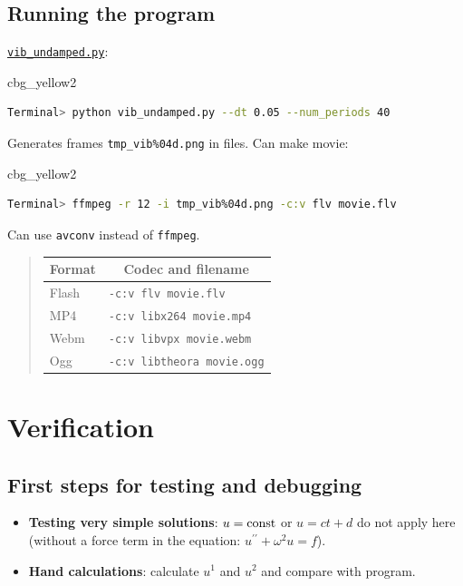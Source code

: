 \documentclass[%
oneside,                 %
final,                   %
10pt]{article}
\newenvironment{_cod_tight}[1]{
   \def\FrameCommand{\colorbox{#1}}
   \FrameRule0.6pt\MakeFramed {\FrameRestore}\vskip3mm}
   {\vskip0mm\endMakeFramed}
\newenvironment{cod}[1]{
\bgroup\rmfamily
\fboxsep=0mm\relax
\begin{_cod_tight}{#1}
\list{}{\parsep=-2mm\parskip=0mm\topsep=0pt\leftmargin=2mm
\rightmargin=2\leftmargin\leftmargin=4pt\relax}
\item\relax}
{\endlist\end{_cod_tight}\egroup}
\begin{document}
\subsection*{Running the program}

\href{{http://tinyurl.com/nm5587k/vib/vib_undamped.py}}{\nolinkurl{vib_undamped.py}}:

\begin{cod}{cbg_yellow2}\begin{lstlisting}[language=bash,style=simple,xleftmargin=2mm]
Terminal> python vib_undamped.py --dt 0.05 --num_periods 40
\end{lstlisting}\end{cod}
\noindent

Generates frames \Verb!tmp_vib%04d.png! in files. Can make movie:

\begin{cod}{cbg_yellow2}\begin{lstlisting}[language=bash,style=simple,xleftmargin=2mm]
Terminal> ffmpeg -r 12 -i tmp_vib%04d.png -c:v flv movie.flv
\end{lstlisting}\end{cod}
\noindent
Can use \texttt{avconv} instead of \texttt{ffmpeg}.


\begin{quote}
\begin{tabular}{ll}
\hline
\multicolumn{1}{c}{ Format } & \multicolumn{1}{c}{ Codec and filename } \\
\hline
Flash  & \texttt{-c:v flv movie.flv}       \\
MP4    & \texttt{-c:v libx264 movie.mp4}   \\
Webm   & \texttt{-c:v libvpx movie.webm}   \\
Ogg    & \texttt{-c:v libtheora movie.ogg} \\
\hline
\end{tabular}
\end{quote}

\noindent

\section*{Verification}


\subsection*{First steps for testing and debugging}

\begin{itemize}
 \item \textbf{Testing very simple solutions}:
   $u=\hbox{const}$ or $u=ct + d$ do not apply here (without a force
   term in the equation: $u^{\prime\prime} + \omega^2u = f$).

 \item \textbf{Hand calculations}: calculate $u^1$ and $u^2$ and compare with program.
\end{itemize}
\end{document}
